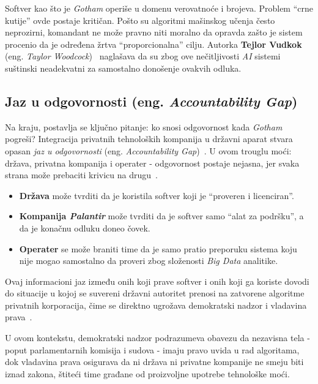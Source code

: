 ﻿\documentclass[12pt]{article}
\begin{document}
Softver kao što je \textit{Gotham} operiše u domenu verovatnoće i brojeva.
Problem \enquote{crne kutije} ovde postaje kritičan.
Pošto su algoritmi mašinskog učenja često neprozirni, komandant ne može pravno niti moralno da opravda zašto je sistem procenio da je određena žrtva \enquote{proporcionalna} cilju.
Autorka \textbf{Tejlor Vudkok} (eng. \textit{Taylor Woodcock})~\cite{woodcock2024human, hua2020rethinking} naglašava da su zbog ove nečitljivosti \textit{AI} sistemi suštinski neadekvatni za samostalno donošenje ovakvih odluka.

\subsection{Jaz u odgovornosti (eng. \textit{Accountability Gap})}

Na kraju, postavlja se ključno pitanje: ko snosi odgovornost kada \textit{Gotham} pogreši? 
Integracija privatnih tehnoloških kompanija u državni aparat stvara opasan \textit{jaz u odgovornosti} (eng. \textit{Accountability Gap})~\cite{architecture2024}. 
U ovom trouglu moći: država, privatna kompanija i operater - odgovornost postaje nejasna, jer svaka strana može prebaciti krivicu na drugu~\cite{carnegie2024private, ulbricht2024palantir}.

\begin{itemize}
    \item \textbf{Država} može tvrditi da je koristila softver koji je \enquote{proveren i licenciran}.
    \item \textbf{Kompanija \textit{Palantir}} može tvrditi da je softver samo \enquote{alat za podršku}, a da je konačnu odluku doneo čovek.
    \item \textbf{Operater} se može braniti time da je samo pratio preporuku sistema koju nije mogao samostalno da proveri zbog složenosti \textit{Big Data} analitike.
\end{itemize}

Ovaj informacioni jaz između onih koji prave softver i onih koji ga koriste dovodi do situacije u kojoj se suvereni državni autoritet prenosi na zatvorene algoritme privatnih korporacija, čime se direktno ugrožava demokratski nadzor i vladavina prava~\cite{carnegie2024private, ulbricht2024palantir, architecture2024}.

U ovom kontekstu, demokratski nadzor podrazumeva obavezu da nezavisna tela - poput parlamentarnih komisija i sudova - imaju pravo uvida u rad algoritama, dok vladavina prava osigurava da ni država ni privatne kompanije ne smeju biti iznad zakona, štiteći time građane od proizvoljne upotrebe tehnološke moći.
\end{document}
